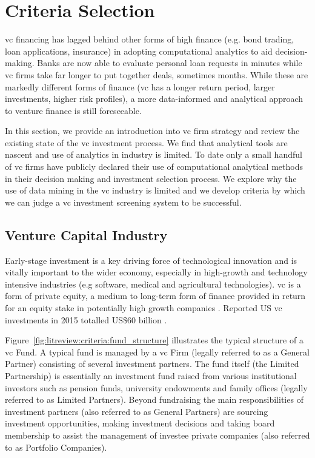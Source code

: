 \documentclass[../thesis/thesis.tex]{subfiles}
\begin{document}
\section{Criteria Selection}

\Gls{vc} financing has lagged behind other forms of high finance (e.g. bond trading, loan applications, insurance) in adopting computational analytics to aid decision-making. Banks are now able to evaluate personal loan requests in minutes while \gls{vc} firms take far longer to put together deals, sometimes months. While these are markedly different forms of finance (\gls{vc} has a longer return period, larger investments, higher risk profiles), a more data-informed and analytical approach to venture finance is still foreseeable.

In this section, we provide an introduction into \gls{vc} firm strategy and review the existing state of the \gls{vc} investment process. We find that analytical tools are nascent and use of analytics in industry is limited. To date only a small handful of \gls{vc} firms have publicly declared their use of computational analytical methods in their decision making and investment selection process. We explore why the use of data mining in the \gls{vc} industry is limited and we develop criteria by which we can judge a \gls{vc} investment screening system to be successful.

\subsection{Venture Capital Industry}

Early-stage investment is a key driving force of technological innovation and is vitally important to the wider economy, especially in high-growth and technology intensive industries (e.g software, medical and agricultural technologies). \Gls{vc} is a form of private equity, a medium to long-term form of finance provided in return for an equity stake in potentially high growth companies \cite{nvca2016}. Reported US \gls{vc} investments in 2015 totalled US\$60 billion \cite{nvca2016}.

Figure~\ref{fig:litreview:criteria:fund_structure} illustrates the typical structure of a \gls{vc} Fund. A typical fund is managed by a \gls{vc} Firm (legally referred to as a General Partner) consisting of several investment partners. The fund itself (the Limited Partnership) is essentially an investment fund raised from various institutional investors such as pension funds, university endowments and family offices (legally referred to as Limited Partners). Beyond fundraising the main responsibilities of investment partners (also referred to as General Partners) are sourcing investment opportunities, making investment decisions and taking board membership to assist the management of investee private companies (also referred to as Portfolio Companies).
\end{document}
